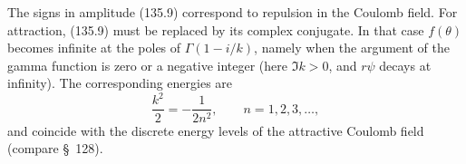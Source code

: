 The signs in amplitude (135.9) correspond to repulsion in the Coulomb field.
For attraction, (135.9) must be replaced by its complex conjugate. In that
case $f(\theta)$ becomes infinite at the poles of $\Gamma(1-i/k)$, namely when
the argument of the gamma function is zero or a negative integer (here
$\Im k>0$, and $r\psi$ decays at infinity). The corresponding energies are
\[
 \frac{k^2}{2}=-\frac{1}{2n^2},\qquad n=1,2,3,\ldots,
\]
and coincide with the discrete energy levels of the attractive Coulomb field
(compare \S~128).
